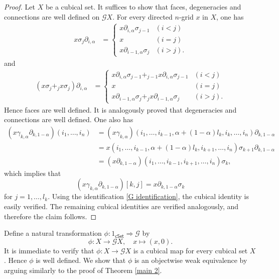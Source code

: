 \documentclass[oneside, 12pt]{amsart}
\numberwithin{equation}{section}
\theoremstyle{plain}
\theoremstyle{definition}
\theoremstyle{remark}
\newcommand{\cSet}{\mathsf{cSet}}
\begin{document}
	\begin{proof}
		Let $X$ be a cubical set. It suffices to show that faces, degeneracies and connections are well defined on $\mathcal{G}X$. For every directed $n$-grid $x$ in $X$, one has
		\begin{align*}
			x\sigma_j\partial_{i,\alpha}&=
			\begin{cases}
				x\partial_{i,\alpha}\sigma_{j-1}&(i<j)\\
				x&(i=j)\\
				x\partial_{i-1,\alpha}\sigma_j&(i>j).
			\end{cases}
		\end{align*}
		and
		\begin{align*}
			(x\sigma_j+_jx\sigma_j)\partial_{i,\alpha}&=
			\begin{cases}
				x\partial_{i,\alpha}\sigma_{j-1}+_{j-1}x\partial_{i,\alpha}\sigma_{j-1}&(i<j)\\
				x&(i=j)\\
				x\partial_{i-1,\alpha}\sigma_j+_jx\partial_{i-1,\alpha}\sigma_j&(i>j).
			\end{cases}
		\end{align*}
		Hence faces are well defined. It is analogously proved that degeneracies and connections are well defined. One also has
		\begin{align*}
			(x\gamma_{k,\alpha}\partial_{k,1-\alpha})(i_1,\ldots,i_n)&=(x\gamma_{k,\alpha})(i_1,\ldots,i_{k-1},\alpha+(1-\alpha)l_k,i_k,\ldots,i_n)\partial_{k,1-\alpha}\\
			&=x(i_1,\ldots,i_{k-1},\alpha+(1-\alpha)l_k,i_{k+1},\ldots,i_n)\sigma_{k+1}\partial_{k,1-\alpha}\\
			&=(x\partial_{k,1-\alpha})(i_1,\ldots,i_{k-1},i_{k+1},\ldots,i_n)\sigma_k,
		\end{align*}
		which implies that
		\[
		(x\gamma_{k,\alpha}\partial_{k,1-\alpha})[k,j]=x\partial_{k,1-\alpha}\sigma_k
		\]
		for $j=1,\ldots,l_k$. Using the identification \eqref{G identification}, the cubical identity is easily verified. The remaining cubical identities are verified analogously, and therefore the claim follows.
	\end{proof}
	
	
	
	Define a natural transformation $\phi\colon 1_{\cSet}\Rightarrow\mathcal{G}$ by
	\[
	\phi\colon X\to\mathcal{G}X,\quad x\mapsto (x,0).
	\]
	It is immediate to verify that $\phi\colon X\to\mathcal{G}X$ is a cubical map for every cubical set $X$. Hence $\phi$ is well defined. We show that \(\phi\) is an objectwise weak equivalence by arguing similarly to the proof of Theorem \ref{main 2}.
	
\end{document}

